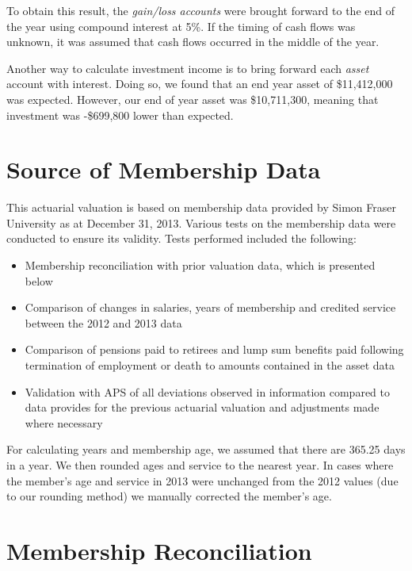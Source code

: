 \documentclass{report}
\begin{document}
\vspace{3mm}
To obtain this result, the \textit{gain/loss accounts} were brought forward to the end of the year using compound interest at 5\%. If the timing of cash flows was unknown, it was assumed that cash flows occurred in the middle of the year.

\vspace{3mm}
Another way to calculate investment income    is to bring forward each \textit{asset} account with interest. Doing so, we found that an end year asset of \$11,412,000 was  expected. However, our end of year asset was \$10,711,300, meaning that investment was -\$699,800 lower than expected.


\section{Source of Membership Data}

This actuarial valuation is based on membership data provided by Simon Fraser University as at December 31, 2013. Various tests on the membership data were conducted to ensure its validity. Tests performed included the following:

\begin{itemize}
\item Membership reconciliation with prior valuation data, which is presented below
\item Comparison of changes in salaries, years of membership and credited service between the 2012 and 2013 data
\item Comparison of pensions paid to retirees and lump sum benefits paid following termination of employment or death to amounts contained in the asset data
\item Validation with APS of all deviations observed in information compared to data provides for the previous actuarial valuation and adjustments made where necessary
\end{itemize}

\vspace{3mm}
For calculating years and membership age, we assumed that there are 365.25 days in a year. We then rounded ages and service to the nearest year. In cases where the member's age and service in 2013 were unchanged from the 2012 values (due to our rounding method) we manually corrected the member's age.

\section{Membership Reconciliation}
\end{document}

